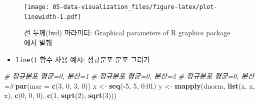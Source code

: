 \documentclass[
  11pt,
]{krantz}
\newenvironment{Shaded}{\begin{snugshade}}{\end{snugshade}}
\newcommand{\CommentTok}[1]{\textcolor[rgb]{0.37,0.37,0.37}{\textit{#1}}}
\newcommand{\DataTypeTok}[1]{\textcolor[rgb]{0.27,0.27,0.27}{#1}}
\newcommand{\DecValTok}[1]{\textcolor[rgb]{0.06,0.06,0.06}{#1}}
\newcommand{\FloatTok}[1]{\textcolor[rgb]{0.06,0.06,0.06}{#1}}
\newcommand{\KeywordTok}[1]{\textcolor[rgb]{0.27,0.27,0.27}{\textbf{#1}}}
\newcommand{\NormalTok}[1]{#1}
\newcommand{\OperatorTok}[1]{\textcolor[rgb]{0.43,0.43,0.43}{\textbf{#1}}}
\newcommand{\StringTok}[1]{\textcolor[rgb]{0.5,0.5,0.5}{#1}}
\providecommand{\tightlist}{%
  \setlength{\itemsep}{0pt}\setlength{\parskip}{0pt}}
\begin{document}
\footnotesize

\begin{figure}
\centering
\texttt{[image: 05-data-visualization\_files/figure-latex/plot-linewidth-1.pdf]}
\caption{\label{fig:plot-linewidth}선 두께(lwd) 파라미터: Graphical parameters of R graphics package 에서 발췌}
\end{figure}

\normalsize

\begin{itemize}
\tightlist
\item
  \texttt{line()} 함수 사용 예시: 정규분포 분포 그리기
\end{itemize}

\footnotesize

\begin{Shaded}
\begin{Highlighting}[]
\CommentTok{# 정규분포 평균=0, 분산=1}
\CommentTok{# 정규분포 평균=0, 분산=2}
\CommentTok{# 정규분포 평균=0, 분산=3}
\KeywordTok{par}\NormalTok{(}\DataTypeTok{mar =} \KeywordTok{c}\NormalTok{(}\DecValTok{3}\NormalTok{, }\DecValTok{0}\NormalTok{, }\DecValTok{3}\NormalTok{, }\DecValTok{0}\NormalTok{))}
\NormalTok{x <-}\StringTok{ }\KeywordTok{seq}\NormalTok{(}\OperatorTok{-}\DecValTok{5}\NormalTok{, }\DecValTok{5}\NormalTok{, }\FloatTok{0.01}\NormalTok{)}
\NormalTok{y <-}\StringTok{ }\KeywordTok{mapply}\NormalTok{(dnorm,}
            \KeywordTok{list}\NormalTok{(x, x, x),}
            \KeywordTok{c}\NormalTok{(}\DecValTok{0}\NormalTok{, }\DecValTok{0}\NormalTok{, }\DecValTok{0}\NormalTok{),}
            \KeywordTok{c}\NormalTok{(}\DecValTok{1}\NormalTok{, }\KeywordTok{sqrt}\NormalTok{(}\DecValTok{2}\NormalTok{), }\KeywordTok{sqrt}\NormalTok{(}\DecValTok{3}\NormalTok{)))}


\end{Highlighting}
\end{Shaded}
\end{document}
